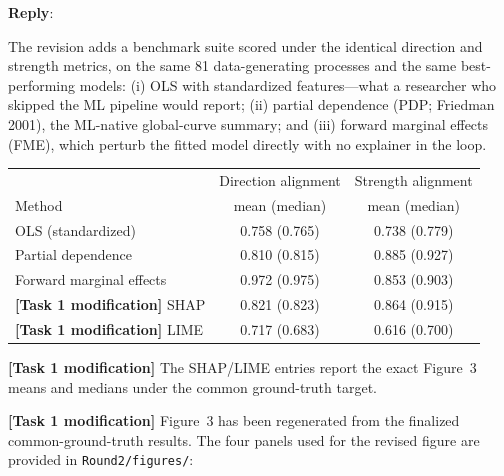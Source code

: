 \documentclass[11pt]{article}
\newcounter{se}[section]
\newenvironment{reply}
 {\par\medskip \noindent \begin{sf}\textbf{Reply}:\ }
 {\medskip \end{sf}}
\begin{document}
\begin{reply}
{\color{red}
The revision adds a benchmark suite scored under the identical direction and strength metrics, on the same 81 data-generating processes and the same best-performing models: (i) OLS with standardized features---what a researcher who skipped the ML pipeline would report; (ii) partial dependence (PDP; Friedman 2001), the ML-native global-curve summary; and (iii) forward marginal effects (FME), which perturb the fitted model directly with no explainer in the loop.

\begin{center}
\begin{tabular}{lcc}
\toprule
 & Direction alignment & Strength alignment \\
Method & mean (median) & mean (median) \\
\midrule
OLS (standardized) & 0.758 (0.765) & 0.738 (0.779) \\
Partial dependence & 0.810 (0.815) & 0.885 (0.927) \\
Forward marginal effects & 0.972 (0.975) & 0.853 (0.903) \\
{\color{blue}\textbf{[Task 1 modification]} SHAP} & {\color{blue}0.821 (0.823)} & {\color{blue}0.864 (0.915)} \\
{\color{blue}\textbf{[Task 1 modification]} LIME} & {\color{blue}0.717 (0.683)} & {\color{blue}0.616 (0.700)} \\
\bottomrule
\end{tabular}
\end{center}
{\color{blue}\textbf{[Task 1 modification]} The SHAP/LIME entries report the exact Figure~3 means and medians under the common ground-truth target.}

{\color{blue}\textbf{[Task 1 modification]} Figure~3 has been regenerated from the finalized common-ground-truth results. The four panels used for the revised figure are provided in \texttt{Round2/figures/}:}

}
\end{reply}
\end{document}
